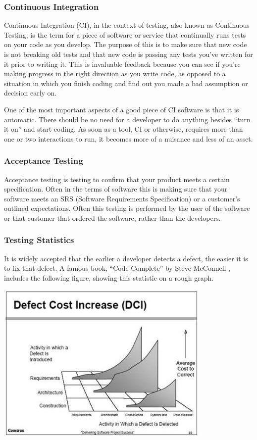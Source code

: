\documentclass[11pt]{article}
\newenvironment{Figure}
  {\par\medskip\noindent\minipage{\linewidth}}
  {\endminipage\par\medskip}
\begin{document}

\subsubsection{Continuous Integration}
Continuous Integration (CI), in the context of testing, also known as Continuous Testing, is the term for a piece of software or service that continually runs tests on your code as you develop. The purpose of this is to make sure that new code is not breaking old tests and that new code is passing any tests you've written for it prior to writing it. This is invaluable feedback because you can see if you're making progress in the right direction as you write code, as opposed to a situation in which you finish coding and find out you made a bad assumption or decision early on. 

One of the most important aspects of a good piece of CI software is that it is automatic. There should be no need for a developer to do anything besides ``turn it on'' and start coding. As soon as a tool, CI or otherwise, requires more than one or two interactions to run, it becomes more of a nuisance and less of an asset.

\subsubsection{Acceptance Testing}
Acceptance testing is testing to confirm that your product meets a certain specification. Often in the terms of software this is making sure that your software meets an SRS (Software Requirements Specification) or a customer's outlined expectations. Often this testing is performed by the user of the software or that customer that ordered the software, rather than the developers.

\subsubsection{Testing Statistics}
It is widely accepted that the earlier a developer detects a defect, the easier it is to fix that defect. A famous book, ``Code Complete'' by Steve McConnell \cite{DefectPic}, includes the following figure, showing this statistic on a rough graph.

\begin{Figure}
	\centering
	\includegraphics[width=0.75\linewidth]{defectcost.jpg} 
\end{Figure}
\end{document}
